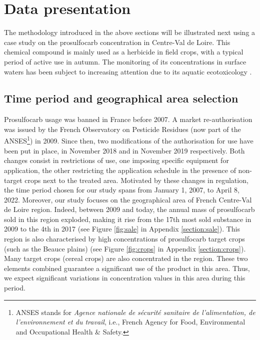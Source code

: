 \section{Data presentation}\label{section:data}

The methodology introduced in the above sections will be illustrated next using a case study on the prosulfocarb  concentration \cite{Prosulfocarb:NIH:url} in Centre-Val de Loire. This chemical compound is mainly used as a herbicide in field crops, with a typical period of active use in autumn. The monitoring of its concentrations in surface waters has been subject to increasing attention due to its aquatic ecotoxicology \cite{PPV,Prosulfocarb:PPDB}.

\subsection{Time period and geographical area selection}
\label{section:data-naiade}

Prosulfocarb usage was banned in France before 2007. A market re-authorisation was issued by the French Observatory on Pesticide Residues (now part of the ANSES\footnote{ANSES stands for \emph{Agence nationale de sécurité sanitaire de l’alimentation, de l’environnement et du travail}, i.e., French Agency for Food, Environmental and Occupational Health \& Safety.}) in 2009.
Since then, two modifications of the authorisation for use have been put in place, in November 2018 and in November 2019 respectively. Both changes consist in restrictions of use, one imposing specific equipment for application, the other restricting the application schedule in the presence of non-target crops next to the treated area. Motivated by these changes in regulation, the time period chosen for our study spans from January 1, 2007, to April 8, 2022.
Moreover, our study focuses on the geographical area of French Centre-Val de Loire region. Indeed, between 2009 and today, the annual mass of prosulfocarb sold in this region  exploded, making it rise from the 17th most sold substance in 2009 to the 4th in 2017 (see Figure \ref{fig:sale} in Appendix \ref{section:sale}). This region is also characterised by high concentrations of prosulfocarb target crops (such as the Beauce plains) (see Figure \ref{fig:crops} in Appendix \ref{section:crops}). 
Many target crops (cereal crops) are also concentrated in the region. These two elements combined guarantee a significant use of the product in this area.  
Thus, we expect significant variations in concentration values in this area during this period. 

